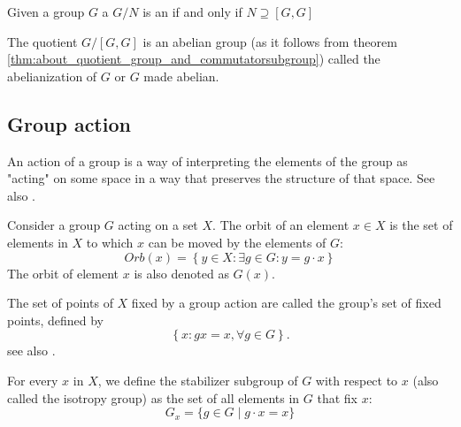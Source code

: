 \begin{appendices}
\begin{theorem}
  Given a group $G$ a  $G/N$ is an
   if and only if $N \supseteq \left[G,
    G\right]$
  \cite{wiki:commutatorsubgroup}
  \label{thm:about_quotient_group_and_commutatorsubgroup}
\end{theorem}

\begin{definition}[Abelianization]
  The quotient $G/[G,G]$ is an abelian group
  (as it follows from theorem \ref{thm:about_quotient_group_and_commutatorsubgroup})
  called the abelianization of $G$ or $G$ made abelian.
  \cite{wiki:commutatorsubgroup}
  \label{def:abelianization}
\end{definition}

\subsection{Group action}

\begin{definition}[Action]
  An action of a group is a way of
  interpreting the elements of the 
  group as "acting" on some space in a way that preserves the structure
  of that space. See also \cite{wiki:groupaction}.
  \label{def:action}
\end{definition}

\begin{definition}[Orbit]
  Consider \cite{wiki:groupaction} a group $G$ acting on a set
  $X$. The orbit of an element $x \in X$ 
  is the set of elements in $X$ to which $x$ can be moved by the elements
  of $G$:
  \[
  Orb\left(x\right) = \left\{y \in X: \exists g \in G: y = g \cdot x \right\}
  \]
  The orbit of element $x$  is also denoted as $G\left(x\right)$.
  \label{def:orbit}
\end{definition}

\begin{definition}
  The set of points of $X$ fixed by a group action are called the
  group's set of fixed points, defined by
  \[
  \left\{
  x: g x = x, \forall g \in G
  \right\}.
  \]
  see also \cite{mathworld:groupfixedpoint}. 
  \label{def:fixedpoint}
\end{definition}

\begin{definition}
  For every $x$ in $X$, we define \cite{wiki:groupaction} the
  stabilizer subgroup of $G$ with 
  respect to $x$ (also called the isotropy group) as the set of all
  elements in $G$ that fix $x$: 
  \[
  G_{x}=\{g\in G\mid g\cdot x=x\}
  \]
  \label{def:stabilizersubgroup}
\end{definition}


\end{appendices}

